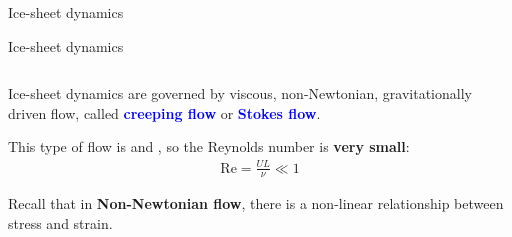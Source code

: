 \documentclass[aspectratio=169,xcolor=dvipsnames]{beamer}
\newcommand\boldblue[1]{\textcolor{blue}{\textbf{#1}}}
\begin{document}

\begin{frame}{}

\centering

{\huge 
Ice-sheet dynamics
}

\end{frame}

\begin{frame}[t]{Ice-sheet dynamics}

\vspace{-0.5em}

\begin{columns}
    \begin{column}{0.5\textwidth}
        Ice-sheet dynamics are governed by viscous, non-Newtonian, gravitationally driven flow, called \boldblue{creeping flow} or \boldblue{Stokes flow}.
        \newline
        
        This type of flow is  and , so the Reynolds number is \textbf{very small}:
        \begin{align*}
            \text{Re}= \frac{UL}{\nu} \ll 1
        \end{align*}

        \begin{block}{}
            {\footnotesize
            Recall that in \textbf{Non-Newtonian flow}, there is a non-linear relationship between stress and strain.
            }
        \end{block}
        

\end{column}
\end{columns}
\end{frame}
\end{document}
